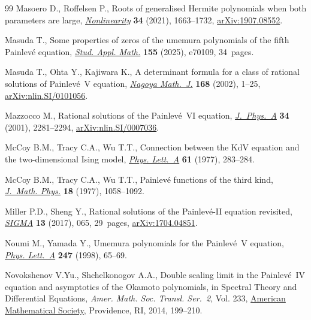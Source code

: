 \documentclass[pdftex]{sigma}
\numberwithin{equation}{section}
\theoremstyle{definition}
\begin{document}
\begin{thebibliography}{99}
Masoero D., Roffelsen P., Roots of generalised {H}ermite polynomials when both
 parameters are large,
 \href{https://doi.org/10.1088/1361-6544/abdd93}{\textit{Nonlinearity}}
 \textbf{34} (2021), 1663--1732,
 \href{http://arxiv.org/abs/1907.08552}{arXiv:1907.08552}.

Masuda T., Some properties of zeros of the umemura polynomials of the fifth
 {P}ainlev\'e equation,
 \href{https://doi.org/10.1111/sapm.70109}{\textit{Stud. Appl. Math.}}
 \textbf{155} (2025), e70109, 34~pages.

Masuda T., Ohta Y., Kajiwara K., A determinant formula for a class of rational
 solutions of {P}ainlev\'e~{V} equation,
 \href{https://doi.org/10.1017/S0027763000008321}{\textit{Nagoya Math.~J.}}
 \textbf{168} (2002), 1--25,
 \href{http://arxiv.org/abs/nlin.SI/0101056}{arXiv:nlin.SI/0101056}.

Mazzocco M., Rational solutions of the {P}ainlev\'e~{VI} equation,
 \href{https://doi.org/10.1088/0305-4470/34/11/320}{\textit{J.~Phys.~A}}
 \textbf{34} (2001), 2281--2294,
 \href{http://arxiv.org/abs/nlin.SI/0007036}{arXiv:nlin.SI/0007036}.

McCoy B.M., Tracy C.A., Wu T.T., Connection between the {K}d{V} equation and
 the two-dimensional {I}sing model,
 \href{https://doi.org/10.1016/0375-9601(77)90613-2}{\textit{Phys. Lett.~A}}
 \textbf{61} (1977), 283--284.

McCoy B.M., Tracy C.A., Wu T.T., Painlev\'e functions of the third kind,
 \href{https://doi.org/10.1063/1.523367}{\textit{J.~Math. Phys.}} \textbf{18}
 (1977), 1058--1092.

Miller P.D., Sheng Y., Rational solutions of the {P}ainlev\'e-{II} equation
 revisited, \href{https://doi.org/10.3842/SIGMA.2017.065}{\textit{SIGMA}}
 \textbf{13} (2017), 065, 29~pages,
 \href{http://arxiv.org/abs/1704.04851}{arXiv:1704.04851}.

Noumi M., Yamada Y., Umemura polynomials for the {P}ainlev\'e~{V} equation,
 \href{https://doi.org/10.1016/S0375-9601(98)00625-2}{\textit{Phys. Lett.~A}}
 \textbf{247} (1998), 65--69.

Novokshenov V.Yu., Shchelkonogov A.A., Double scaling limit in the
 {P}ainlev\'e~{IV} equation and asymptotics of the {O}kamoto polynomials, in
 Spectral {T}heory and {D}ifferential {E}quations, \textit{Amer. Math. Soc.
 Transl. Ser.~2}, Vol. 233,
 \href{https://doi.org/10.1090/trans2/233/12}{American Mathematical Society},
 Providence, RI, 2014, 199--210.


\end{thebibliography}
\end{document}
